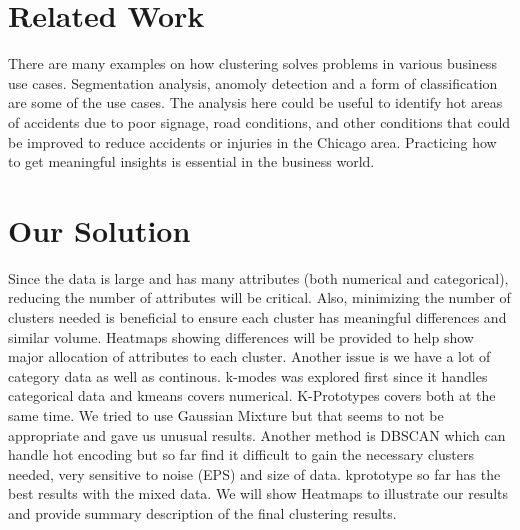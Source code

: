 \documentclass[conference]{IEEEtran}
\begin{document}
\section{Related Work}
There are many examples on how clustering solves problems in various business use cases.  Segmentation analysis, anomoly detection and a form of classification are some of the use cases. The analysis here could be useful to identify hot areas of accidents due to poor signage, road conditions, and other conditions that could be 
improved to reduce accidents or injuries in the Chicago area.  Practicing how to get meaningful insights is essential in the business world. 


\section{Our Solution}
Since the data is large and has many attributes (both numerical and categorical), reducing the number of attributes will be critical.  Also, minimizing the number of clusters needed is beneficial to ensure each cluster has meaningful differences and similar volume. Heatmaps showing differences will be 
provided to help show major allocation of attributes to each cluster. Another issue is we have a lot of category data as well as continous.  k-modes was explored first since it handles categorical data and kmeans covers numerical.  K-Prototypes covers both at the same time.  We tried to use Gaussian Mixture but that seems to not be appropriate and gave us unusual results.  Another method is DBSCAN which can handle hot encoding but so far find it difficult to gain the necessary clusters needed, very sensitive to noise (EPS) and size of data.  kprototype so far has the best results with the mixed data.  We will show Heatmaps to illustrate our results and provide summary description of the final clustering results.
\end{document}
